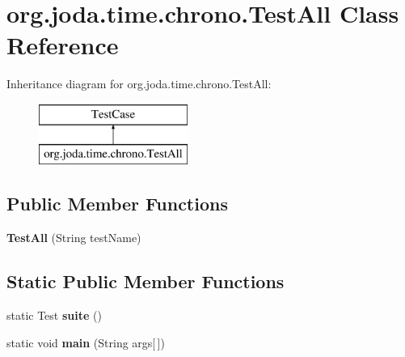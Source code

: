 \hypertarget{classorg_1_1joda_1_1time_1_1chrono_1_1_test_all}{\section{org.\-joda.\-time.\-chrono.\-Test\-All Class Reference}
\label{classorg_1_1joda_1_1time_1_1chrono_1_1_test_all}
}
Inheritance diagram for org.\-joda.\-time.\-chrono.\-Test\-All\-:\begin{figure}[H]
\begin{center}
\leavevmode
\includegraphics[height=2.000000cm]{classorg_1_1joda_1_1time_1_1chrono_1_1_test_all}
\end{center}
\end{figure}
\subsection*{Public Member Functions}
\begin{DoxyCompactItemize}
\item 
\hypertarget{classorg_1_1joda_1_1time_1_1chrono_1_1_test_all_aad9c6fa35116d5f9a40a6d0b114709df}{{\bfseries Test\-All} (String test\-Name)}\label{classorg_1_1joda_1_1time_1_1chrono_1_1_test_all_aad9c6fa35116d5f9a40a6d0b114709df}

\end{DoxyCompactItemize}
\subsection*{Static Public Member Functions}
\begin{DoxyCompactItemize}
\item 
\hypertarget{classorg_1_1joda_1_1time_1_1chrono_1_1_test_all_a58e9df79111d9bb7f3ff0770d30e43d6}{static Test {\bfseries suite} ()}\label{classorg_1_1joda_1_1time_1_1chrono_1_1_test_all_a58e9df79111d9bb7f3ff0770d30e43d6}

\item 
\hypertarget{classorg_1_1joda_1_1time_1_1chrono_1_1_test_all_a02c71ce251b5ed805070ead43ada51c3}{static void {\bfseries main} (String args\mbox{[}$\,$\mbox{]})}\label{classorg_1_1joda_1_1time_1_1chrono_1_1_test_all_a02c71ce251b5ed805070ead43ada51c3}

\end{DoxyCompactItemize}
